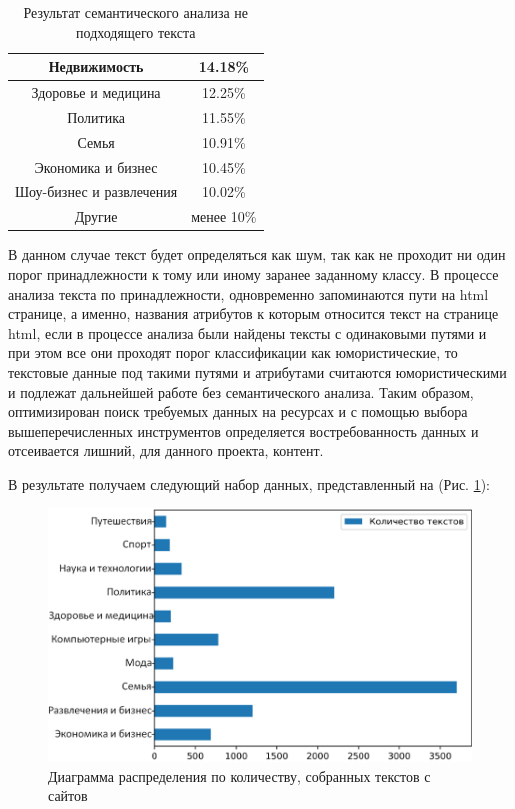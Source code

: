 \begin{table}[H]
  \caption{Результат семантического анализа не подходящего текста}
  \label{tbl:text_a02}
  \begin{center}
  \begin{tabular}{ | c | c | }
    \hline
    Недвижимость &	14.18\% \\ \hline
    Здоровье и медицина	& 12.25\% \\ \hline
    Политика & 11.55\% \\ \hline
    Семья	& 10.91\% \\ \hline
    Экономика и бизнес & 10.45\% \\ \hline
    Шоу-бизнес и развлечения & 10.02\% \\ \hline
    Другие & менее 10\% \\ \hline
  \end{tabular}
  \end{center}
\end{table}

В данном случае текст будет определяться как шум, так как не проходит ни один порог принадлежности к тому или иному заранее заданному классу.
В процессе анализа текста по принадлежности, одновременно запоминаются пути на html странице, а именно, 
названия атрибутов к которым относится текст на странице html, если в процессе анализа были найдены 
тексты с одинаковыми путями и при этом все они проходят порог классификации как юмористические, то 
текстовые данные под такими путями и атрибутами считаются юмористическими и подлежат дальнейшей работе без семантического анализа.
Таким образом, оптимизирован поиск требуемых данных на ресурсах и с помощью выбора вышеперечисленных 
инструментов определяется востребованность данных и отсеивается лишний, для данного проекта, контент.

В результате получаем следующий набор данных, представленный на (Рис. \ref{pic:ris14}): 

\begin{figure}[H]
\includegraphics[width=0.75\columnwidth]{./img/ris14.png}
\centering
\caption{Диаграмма распределения по количеству, собранных текстов с сайтов}
\label{pic:ris14}
\end{figure}

